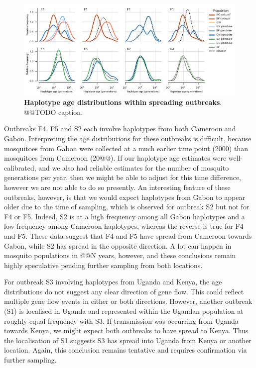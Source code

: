 \documentclass[a4paper,11pt,abstracton,hidelinks]{scrartcl}
\begin{document}
%
\begin{figure}[!b]
  \includegraphics[width=1.1\linewidth,center]{artwork/outbreak_hap_age_dist_3.pdf}
  \caption{\textbf{Haplotype age distributions within spreading outbreaks}. @@TODO caption.}
  \label{fig:outbreak_spread}
\end{figure}


%
Outbreaks F4, F5 and S2 each involve haplotypes from both Cameroon and Gabon.
%
Interpreting the age distributions for these outbreaks is difficult, because mosquitoes from Gabon were collected at a much earlier time point (2000) than mosquitoes from Cameroon (20@@).
%
If our haplotype age estimates were well-calibrated, and we also had reliable estimates for the number of mosquito generations per year, then we might be able to adjust for this time difference, however we are not able to do so presently.
%
An interesting feature of these outbreaks, however, is that we would expect haplotypes from Gabon to appear older due to the time of sampling, which is observed for outbreak S2 but not for F4 or F5.
%
Indeed, S2 is at a high frequency among all Gabon haplotypes and a low frequency among Cameroon haplotypes, whereas the reverse is true for F4 and F5.
%
These data suggest that F4 and F5 have spread from Cameroon towards Gabon, while S2 has spread in the opposite direction.
%
A lot can happen in mosquito populations in @@N years, however, and these conclusions remain highly speculative pending further sampling from both locations. 
%


%
For outbreak S3 involving haplotypes from Uganda and Kenya, the age distributions do not suggest any clear direction of gene flow.
%
This could reflect multiple gene flow events in either or both directions.
%
However, another outbreak (S1) is localised in Uganda and represented within the Ugandan population at roughly equal frequency with S3.
%
If transmission was occurring from Uganda towards Kenya, we might expect both outbreaks to have spread to Kenya.
%
Thus the localisation of S1 suggests S3 has spread into Uganda from Kenya or another location.
%
Again, this conclusion remains tentative and requires confirmation via further sampling.
\end{document}

